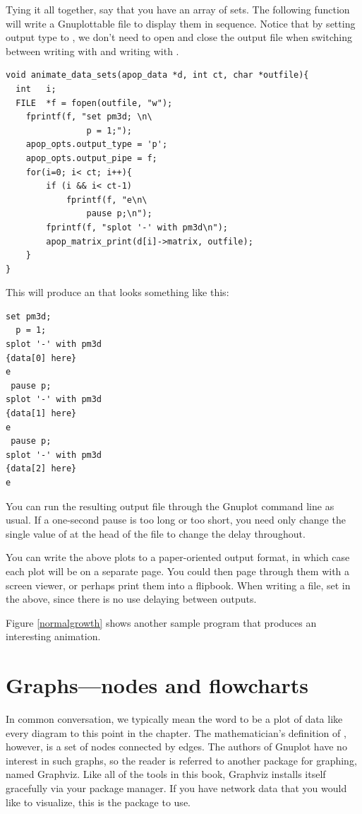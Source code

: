Tying it all together, say that you have an array of  
sets. The following function will write a Gnuplottable file to display
them in sequence. Notice that by setting output type to , we don't
need to open and close the output file when switching between
writing with  and writing with
.
\begin{lstlisting}
void animate_data_sets(apop_data *d, int ct, char *outfile){
  int   i;
  FILE  *f = fopen(outfile, "w");
    fprintf(f, "set pm3d; \n\
                p = 1;");
    apop_opts.output_type = 'p';
    apop_opts.output_pipe = f;
    for(i=0; i< ct; i++){
        if (i && i< ct-1)
            fprintf(f, "e\n\
                pause p;\n");
        fprintf(f, "splot '-' with pm3d\n");
        apop_matrix_print(d[i]->matrix, outfile);
    }
}
\end{lstlisting}
This will produce an  that looks something like this:
\begin{lstlisting}
set pm3d;
  p = 1;
splot '-' with pm3d
{data[0] here}
e
 pause p;
splot '-' with pm3d
{data[1] here}
e
 pause p;
splot '-' with pm3d
{data[2] here}
e
\end{lstlisting}

You can run the resulting output file through the Gnuplot command line
as usual. If a one-second pause is too long or too short, you need only
change the single value of \ci{p} at the head of the file to change the
delay throughout.

You can write the above plots to a paper-oriented output format, in which
case each plot will be on a separate page. You could then page through
them with a screen viewer, or perhaps print them into a flipbook. When writing a
file, set \ci{p=0} in the above, since there is no use delaying between
outputs.

Figure \ref{normalgrowth} shows another sample program that produces an
interesting animation.


\section{\treesymbol Graphs---nodes and flowcharts} In common conversation, we
typically mean the word  to be a plot of data like every
diagram to this point in the chapter. The mathematician's definition
of \airq{graph}, however, is a set of nodes connected by edges. The
authors of Gnuplot have no interest in such graphs, so the reader is
referred to another package for graphing, named Graphviz. Like
all of the tools in this book, Graphviz installs itself
gracefully via your package manager. If you have network data that you
would like to visualize, this is the package to use.

